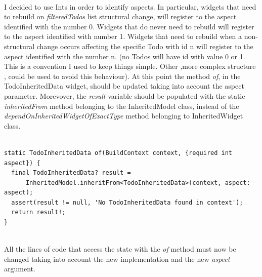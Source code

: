 \mbox{}\\
I decided to use Ints in order to identify aspects. In particular, widgets that need to rebuild on \textit{filteredTodos} list structural change, will register to the aspect identified with the number 0. Widgets that do never need to rebuild will register to the aspect identified with number 1. Widgets that need to rebuild when a non-structural change occurs affecting the specific Todo with id n  will register to the aspect identified with the number n. (no Todos will have id with value 0 or 1. This is a convention I used to keep things simple. Other ,more complex structure , could be used to avoid this behaviour). 
At this point the method \textit{of}, in the TodoInheritedData widget, should be updated taking into account the aspect parameter. Morevover, the \textit{result} variable should be populated with the static \textit{inheritedFrom  } method belonging to the InheritedModel class, instead of the \textit{dependOnInheritedWidgetOfExactType} method belonging to InheritedWidget class.
\mbox{}\\
\begin{code}
\mbox{}
\label{code:2.45}
\begin{verbatim}

static TodoInheritedData of(BuildContext context, {required int aspect}) {
  final TodoInheritedData? result =
      InheritedModel.inheritFrom<TodoInheritedData>(context, aspect: aspect);
  assert(result != null, 'No TodoInheritedData found in context');
  return result!;
}
\end{verbatim}
\end{code}
\mbox{}\\
All the lines of code that access the state with the \textit{of} method must now be changed taking into account the new implementation and the new \textit{aspect} argument.
\mbox{}\\

